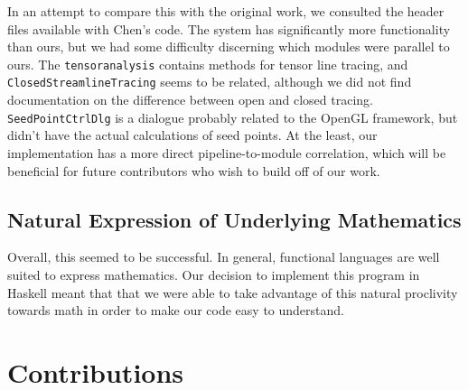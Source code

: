 \documentclass[twocolumn]{article}
\begin{document}
In an attempt to compare this with the original work, we consulted the header
files available with Chen’s code. The system has significantly more
functionality than ours, but we had some difficulty discerning which modules
were parallel to ours. The \texttt{tensoranalysis} contains methods for tensor
line tracing, and \texttt{ClosedStreamlineTracing} seems to be related,
although we did not find documentation on the difference between open and
closed tracing. \texttt{SeedPointCtrlDlg} is a dialogue probably related to the
OpenGL framework, but didn’t have the actual calculations of seed points. At
the least, our implementation has a more direct pipeline-to-module correlation,
which will be beneficial for future contributors who wish to build off of our
work.

\subsection{Natural Expression of Underlying Mathematics}
Overall, this seemed to be successful. In general, functional languages are
well suited to express mathematics. Our decision to implement this program in
Haskell meant that that we were able to take advantage of this natural
proclivity towards math in order to make our code easy to understand.

\section{Contributions}



\end{document}
